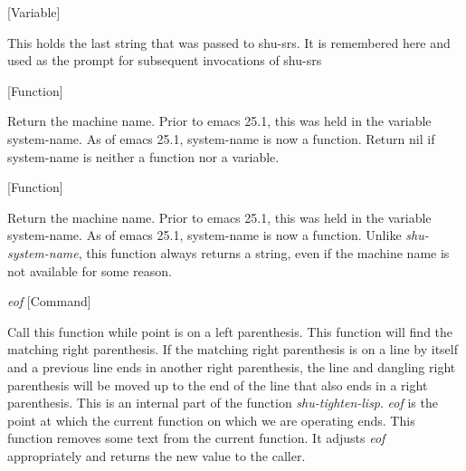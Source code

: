 \vspace{1em}
\noindent
{}
\usebox{\funcname}
 \hfill [Variable]

\begin{doc-string}
This holds the last string that was passed to shu-srs.  It is remembered here and used as the
prompt for subsequent invocations of shu-srs
\end{doc-string}

\vspace{1em}
\noindent
{}
\usebox{\funcname}
 \hfill [Function]

\begin{doc-string}
Return the machine name.  Prior to emacs 25.1, this was held in the variable
system-name.  As of emacs 25.1, system-name is now a function.  Return nil if
system-name is neither a function nor a variable.
\end{doc-string}

\vspace{1em}
\noindent
{}
\usebox{\funcname}
 \hfill [Function]

\begin{doc-string}
Return the machine name.  Prior to emacs 25.1, this was held in the variable
system-name.  As of emacs 25.1, system-name is now a function.  Unlike
\emph{shu-system-name}, this function always returns a string, even if the machine
name is not available for some reason.
\end{doc-string}

\vspace{1em}
\noindent
{}
\usebox{\funcname}\emph{eof}
 \hfill [Command]

\begin{doc-string}
Call this function while point is on a left parenthesis.  This function will
find the matching right parenthesis.  If the matching right parenthesis is on a line
by itself and a previous line ends in another right parenthesis, the line and
dangling right parenthesis will be moved up to the end of the line that also ends
in a right parenthesis.  This is an internal part of the function \emph{shu-tighten-lisp}.
\emph{eof} is the point at which the current function on which we are operating ends.
This function removes some text from the current function.  It adjusts \emph{eof} appropriately
and returns the new value to the caller.
\end{doc-string}

